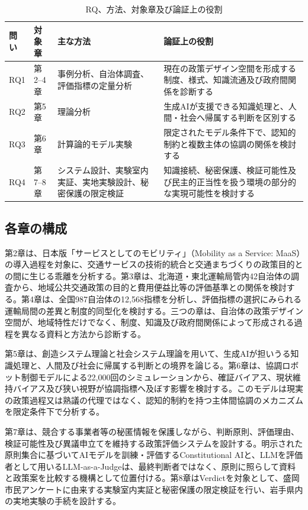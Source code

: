 \begin{table}[H]
  \centering
  \caption{RQ、方法、対象章及び論証上の役割}
  \label{tab:rq_structure}
  \small
  \begin{tabularx}{\textwidth}{p{}p{}p{}X}
    \toprule
    問い & 対象章 & 主な方法 & 論証上の役割 \\
    \midrule
    RQ1 & 第2--4章 & 事例分析、自治体調査、評価指標の定量分析 & 現在の政策デザイン空間を形成する制度、様式、知識流通及び政府間関係を診断する \\
    RQ2 & 第5章 & 理論分析 & 生成AIが支援できる知識処理と、人間・社会へ帰属する判断を区別する \\
    RQ3 & 第6章 & 計算論的モデル実験 & 限定されたモデル条件下で、認知的制約と複数主体の協調の関係を検討する \\
    RQ4 & 第7--8章 & システム設計、実験室内実証、実地実験設計、秘密保護の限定検証 & 知識接続、秘密保護、検証可能性及び民主的正当性を扱う環境の部分的な実現可能性を検討する \\
    \bottomrule
  \end{tabularx}
\end{table}

\subsection{各章の構成}
\label{subsec:intro_chapter_outline}

第2章は、日本版「サービスとしてのモビリティ」（Mobility as a Service: MaaS）の導入過程を対象に、交通サービスの技術的統合と交通まちづくりの政策目的との間に生じる乖離を分析する。第3章は、北海道・東北運輸局管内42自治体の調査から、地域公共交通政策の目的と費用便益比等の評価基準との関係を検討する。第4章は、全国987自治体の12,568指標を分析し、評価指標の選択にみられる運輸局間の差異と制度的同型化を検討する。三つの章は、自治体の政策デザイン空間が、地域特性だけでなく、制度、知識及び政府間関係によって形成される過程を異なる資料と方法から診断する。

第5章は、創造システム理論と社会システム理論を用いて、生成AIが担いうる知識処理と、人間及び社会に帰属する判断との境界を論じる。第6章は、協調ロボット制御モデルによる22,000回のシミュレーションから、確証バイアス、現状維持バイアス及び狭い視野が協調指標へ及ぼす影響を検討する。このモデルは現実の政策過程又は熟議の代理ではなく、認知的制約を持つ主体間協調のメカニズムを限定条件下で分析する。

第7章は、競合する事業者等の秘匿情報を保護しながら、判断原則、評価理由、検証可能性及び異議申立てを維持する政策評価システムを設計する。明示された原則集合に基づいてAIモデルを訓練・評価するConstitutional AIと、LLMを評価者として用いるLLM-as-a-Judgeは、最終判断者ではなく、原則に照らして資料と政策案を比較する機構として位置付ける。第8章はVerdictを対象として、盛岡市民アンケートに由来する実験室内実証と秘密保護の限定検証を行い、岩手県内の実地実験の手続を設計する。

